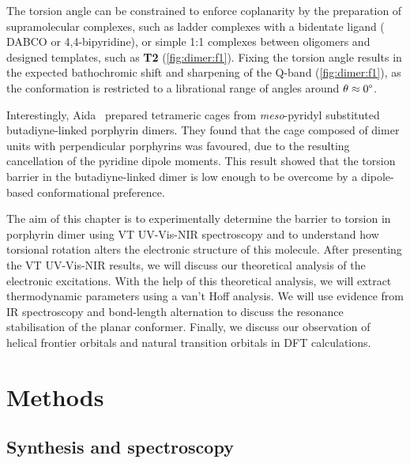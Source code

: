 	The torsion angle can be constrained to enforce coplanarity by the preparation of supramolecular complexes, such as ladder complexes with a bidentate ligand ( DABCO or 4,4\textprime-bipyridine),\autocite{Taylor1999} or simple 1:1 complexes between oligomers and designed templates, such as \textbf{T2} (\autoref{fig:dimer:f1}).\autocite{Winters2007,Winters2007b} Fixing the torsion angle results in the expected bathochromic shift and sharpening of the Q-band (\autoref{fig:dimer:f1}), as the conformation is restricted to a librational range of angles around $\theta \approx 0\degree$.

	Interestingly, Aida \ prepared tetrameric cages from \textit{meso}-pyridyl substituted butadiyne-linked porphyrin dimers.\autocite{Tsuda2005} They found that the cage composed of dimer units with perpendicular porphyrins was favoured, due to the resulting cancellation of the pyridine dipole moments. This result showed that the torsion barrier in the butadiyne-linked dimer is low enough to be overcome by a dipole-based conformational preference.\autocite{Tsuda2005}

	The aim of this chapter is to experimentally determine the barrier to torsion in porphyrin dimer  using VT UV-Vis-NIR spectroscopy and to understand how torsional rotation alters the electronic structure of this molecule. After presenting the VT UV-Vis-NIR results, we will discuss our theoretical analysis of the electronic excitations. With the help of this theoretical analysis, we will extract thermodynamic parameters using a van't Hoff analysis. We will use evidence from IR spectroscopy and bond-length alternation to discuss the resonance stabilisation of the planar conformer. Finally, we discuss our observation of helical frontier orbitals and natural transition orbitals in DFT calculations. 
	\FloatBarrier

	\section{Methods}

	\subsection{Synthesis and spectroscopy}

